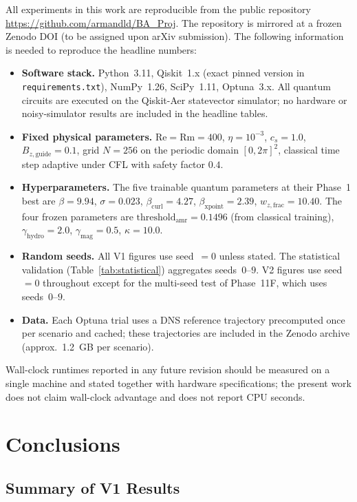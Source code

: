 \documentclass[12pt, a4paper, oneside]{report}
\begin{document}
All experiments in this work are reproducible from the public repository \url{https://github.com/armandld/BA_Proj}. The repository is mirrored at a frozen Zenodo DOI (to be assigned upon arXiv submission). The following information is needed to reproduce the headline numbers:
\begin{itemize}
    \item \textbf{Software stack.} Python~3.11, Qiskit~1.x (exact pinned version in \texttt{requirements.txt}), NumPy~1.26, SciPy~1.11, Optuna~3.x. All quantum circuits are executed on the Qiskit-Aer statevector simulator; no hardware or noisy-simulator results are included in the headline tables.
    \item \textbf{Fixed physical parameters.} $\mathrm{Re} = \mathrm{Rm} = 400$, $\eta = 10^{-3}$, $c_s = 1.0$, $B_{z,\text{guide}} = 0.1$, grid $N = 256$ on the periodic domain $[0, 2\pi]^2$, classical time step adaptive under CFL with safety factor $0.4$.
    \item \textbf{Hyperparameters.} The five trainable quantum parameters at their Phase~1 best are $\beta = 9.94$, $\sigma = 0.023$, $\beta_{\text{curl}} = 4.27$, $\beta_{\text{xpoint}} = 2.39$, $w_{z,\text{frac}} = 10.40$. The four frozen parameters are $\text{threshold}_{\text{amr}} = 0.1496$ (from classical training), $\gamma_{\text{hydro}} = 2.0$, $\gamma_{\text{mag}} = 0.5$, $\kappa = 10.0$.
    \item \textbf{Random seeds.} All V1 figures use seed~$=0$ unless stated. The statistical validation (Table~\ref{tab:statistical}) aggregates seeds~$0$--$9$. V2 figures use seed~$=0$ throughout except for the multi-seed test of Phase~11F, which uses seeds~$0$--$9$.
    \item \textbf{Data.} Each Optuna trial uses a DNS reference trajectory precomputed once per scenario and cached; these trajectories are included in the Zenodo archive (approx.\ 1.2~GB per scenario).
\end{itemize}
Wall-clock runtimes reported in any future revision should be measured on a single machine and stated together with hardware specifications; the present work does not claim wall-clock advantage and does not report CPU seconds.

\chapter{Conclusions}
\label{chap:conclusions}

\section{Summary of V1 Results}
\end{document}
